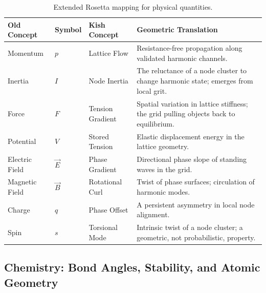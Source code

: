 \documentclass[12pt,oneside]{book}
\begin{document}
\begin{table}[H]
\centering
\begin{tabular}{>{\raggedright}p{3cm} >{\centering}p{2cm} >{\raggedright}p{4cm} >{\raggedright\arraybackslash}p{5cm}}
\toprule
\textbf{Old Concept} & \textbf{Symbol} & \textbf{Kish Concept} & \textbf{Geometric Translation} \\
\midrule
Momentum & \(p\) & Lattice Flow & 
Resistance-free propagation along validated harmonic channels. \\
Inertia & \(I\) & Node Inertia & 
The reluctance of a node cluster to change harmonic state; emerges from local grit. \\
Force & \(F\) & Tension Gradient & 
Spatial variation in lattice stiffness; the grid pulling objects back to equilibrium. \\
Potential & \(V\) & Stored Tension & 
Elastic displacement energy in the lattice geometry. \\
Electric Field & \(\vec{E}\) & Phase Gradient & 
Directional phase slope of standing waves in the grid. \\
Magnetic Field & \(\vec{B}\) & Rotational Curl & 
Twist of phase surfaces; circulation of harmonic modes. \\
Charge & \(q\) & Phase Offset & 
A persistent asymmetry in local node alignment. \\
Spin & \(s\) & Torsional Mode & 
Intrinsic twist of a node cluster; a geometric, not probabilistic, property. \\
\bottomrule
\end{tabular}
\caption{Extended Rosetta mapping for physical quantities.}
\end{table}

\subsection{Chemistry: Bond Angles, Stability, and Atomic Geometry}
\end{document}
